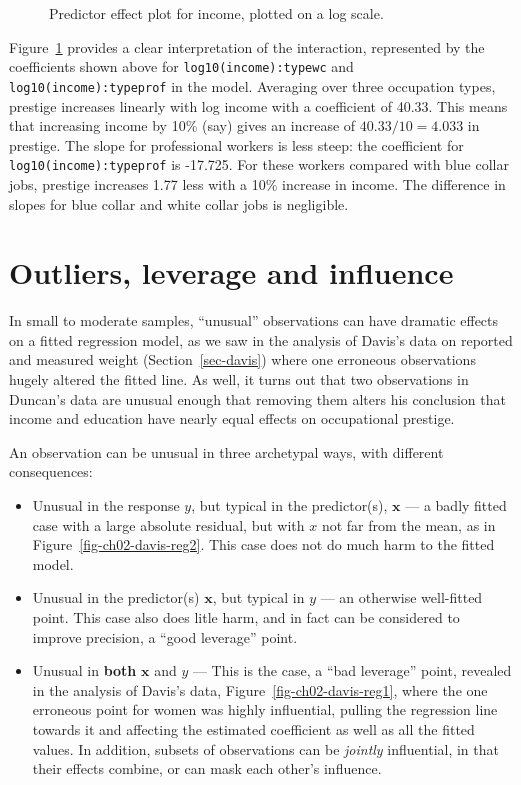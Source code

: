 \documentclass[
  letterpaper,
  10pt,
  krantz2]{krantz}
\begin{document}
{\begin{figure}[H]
{}

\caption{\label{fig-prestige-effplot-inc-log}Predictor effect plot for
income, plotted on a log scale.}

\end{figure}%

Figure~\ref{fig-prestige-effplot-inc-log} provides a clear
interpretation of the interaction, represented by the coefficients shown
above for \texttt{log10(income):typewc} and
\texttt{log10(income):typeprof} in the model. Averaging over three
occupation types, prestige increases linearly with log income with a
coefficient of 40.33. This means that increasing income by 10\% (say)
gives an increase of \(40.33 / 10 = 4.033\) in prestige. The slope for
professional workers is less steep: the coefficient for
\texttt{log10(income):typeprof} is -17.725. For these workers compared
with blue collar jobs, prestige increases 1.77 less with a 10\% increase
in income. The difference in slopes for blue collar and white collar
jobs is negligible.

\section{Outliers, leverage and influence}\label{sec-leverage}

In small to moderate samples, ``unusual'' observations can have dramatic
effects on a fitted regression model, as we saw in the analysis of
Davis's data on reported and measured weight (Section~\ref{sec-davis})
where one erroneous observations hugely altered the fitted line. As
well, it turns out that two observations in Duncan's data are unusual
enough that removing them alters his conclusion that income and
education have nearly equal effects on occupational prestige.

An observation can be unusual in three archetypal ways, with different
consequences:

\begin{itemize}
\item
  Unusual in the response \(y\), but typical in the predictor(s),
  \(\mathbf{x}\) --- a badly fitted case with a large absolute residual,
  but with \(x\) not far from the mean, as in
  Figure~\ref{fig-ch02-davis-reg2}. This case does not do much harm to
  the fitted model.
\item
  Unusual in the predictor(s) \(\mathbf{x}\), but typical in \(y\) ---
  an otherwise well-fitted point. This case also does litle harm, and in
  fact can be considered to improve precision, a ``good leverage''
  point.
\item
  Unusual in \textbf{both} \(\mathbf{x}\) and \(y\) --- This is the
  case, a ``bad leverage'' point, revealed in the analysis of Davis's
  data, Figure~\ref{fig-ch02-davis-reg1}, where the one erroneous point
  for women was highly influential, pulling the regression line towards
  it and affecting the estimated coefficient as well as all the fitted
  values. In addition, subsets of observations can be \emph{jointly}
  influential, in that their effects combine, or can mask each other's
  influence.
\end{itemize}

}
\end{document}
